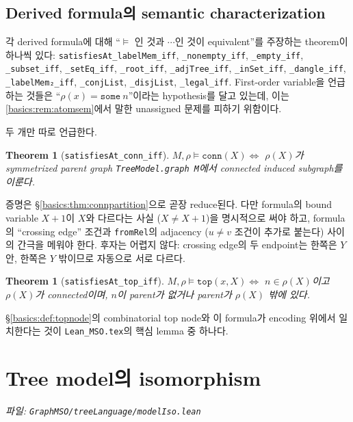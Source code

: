 \documentclass[11pt]{article}
\theoremstyle{definition}
\theoremstyle{plain}
\newtheorem{theorem}[definition]{Theorem}
\newcommand{\lean}[1]{\texttt{#1}}
\newcommand{\leanfile}[1]{\texttt{#1}}
\begin{document}
\subsection{Derived formula의 semantic characterization}

각 derived formula에 대해 ``$\models$ 인 것과 $\cdots$인 것이 equivalent''를
주장하는 theorem이 하나씩 있다: \lean{satisfiesAt\_labelMem\_iff},
\lean{\_nonempty\_iff}, \lean{\_empty\_iff}, \lean{\_subset\_iff},
\lean{\_setEq\_iff}, \lean{\_root\_iff}, \lean{\_adjTree\_iff},
\lean{\_inSet\_iff}, \lean{\_dangle\_iff}, \lean{\_labelMem₂\_iff},
\lean{\_conjList}, \lean{\_disjList}, \lean{\_legal\_iff}.
First-order variable을 언급하는 것들은 ``$\rho(x) = \lean{some}\ n$''이라는
hypothesis를 달고 있는데, 이는 \ref{basics:rem:atomsem}에서 말한 unassigned
문제를 피하기 위함이다.

두 개만 따로 언급한다.

\begin{theorem}[\lean{satisfiesAt\_conn\_iff}]
\label{basics:thm:conniff}
$M, \rho \models \lean{conn}(X) \iff$ $\rho(X)$가 symmetrized parent graph
\lean{TreeModel.graph M}에서 connected induced subgraph를 이룬다.
\end{theorem}

증명은 \S\ref{basics:thm:connpartition}으로 곧장 reduce된다. 다만 formula의
bound variable $X+1$이 $X$와 다르다는 사실 ($X \ne X+1$)을 명시적으로 써야
하고, formula의 ``crossing edge'' 조건과 \lean{fromRel}의 adjacency ($u \ne v$
조건이 추가로 붙는다) 사이의 간극을 메워야 한다. 후자는 어렵지 않다: crossing
edge의 두 endpoint는 한쪽은 $Y$ 안, 한쪽은 $Y$ 밖이므로 자동으로 서로 다르다.

\begin{theorem}[\lean{satisfiesAt\_top\_iff}]
\label{basics:thm:topiff}
$M, \rho \models \lean{top}(x, X) \iff$
$n \in \rho(X)$이고 $\rho(X)$가 connected이며,
$n$이 parent가 없거나 parent가 $\rho(X)$ 밖에 있다.
\end{theorem}

\S\ref{basics:def:topnode}의 combinatorial top node와 이 formula가 encoding
위에서 일치한다는 것이 \leanfile{Lean\_MSO.tex}의 핵심 lemma 중 하나다.

\section{Tree model의 isomorphism}
\label{basics:sec:modeliso}

\emph{파일: \leanfile{GraphMSO/treeLanguage/modelIso.lean}}
\end{document}
